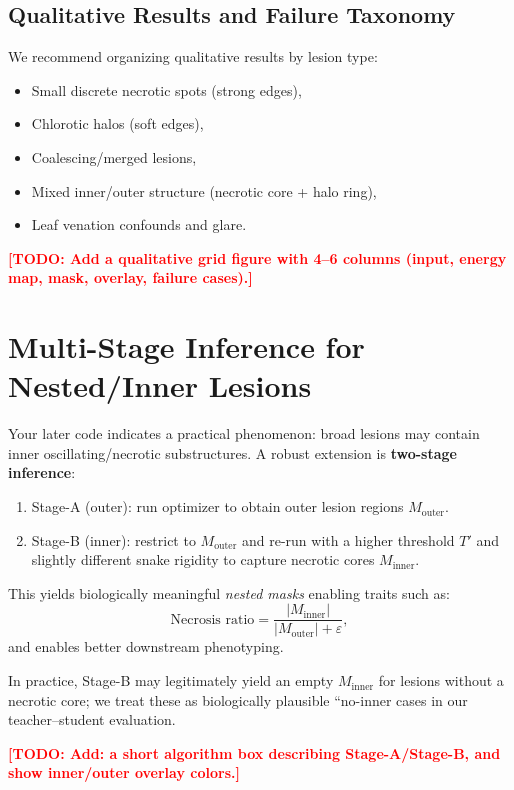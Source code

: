 \documentclass[journal]{IEEEtran}
\newcommand{\TODO}[1]{\textcolor{red}{\textbf{[TODO: #1]}}}
\begin{document}
\subsection{Qualitative Results and Failure Taxonomy}
We recommend organizing qualitative results by lesion type:
\begin{itemize}
    \item Small discrete necrotic spots (strong edges),
    \item Chlorotic halos (soft edges),
    \item Coalescing/merged lesions,
    \item Mixed inner/outer structure (necrotic core + halo ring),
    \item Leaf venation confounds and glare.
\end{itemize}
\TODO{Add a qualitative grid figure with 4--6 columns (input, energy map, mask, overlay, failure cases).}

\section{Multi-Stage Inference for Nested/Inner Lesions}
\label{sec:multistage}
Your later code indicates a practical phenomenon: broad lesions may contain inner oscillating/necrotic substructures.
A robust extension is \textbf{two-stage inference}:
\begin{enumerate}
    \item Stage-A (outer): run optimizer to obtain outer lesion regions $M_{\text{outer}}$.
    \item Stage-B (inner): restrict to $M_{\text{outer}}$ and re-run with a higher threshold $T'$ and slightly different snake rigidity to capture necrotic cores $M_{\text{inner}}$.
\end{enumerate}
This yields biologically meaningful \emph{nested masks} enabling traits such as:
\begin{equation}
\text{Necrosis ratio} = \frac{|M_{\text{inner}}|}{|M_{\text{outer}}|+\varepsilon},
\end{equation}
and enables better downstream phenotyping.

In practice, Stage-B may legitimately yield an empty $M_{\text{inner}}$ for lesions without a necrotic core; we treat these as biologically plausible ``no-inner cases in our teacher--student evaluation.

\TODO{Add: a short algorithm box describing Stage-A/Stage-B, and show inner/outer overlay colors.}
\end{document}
